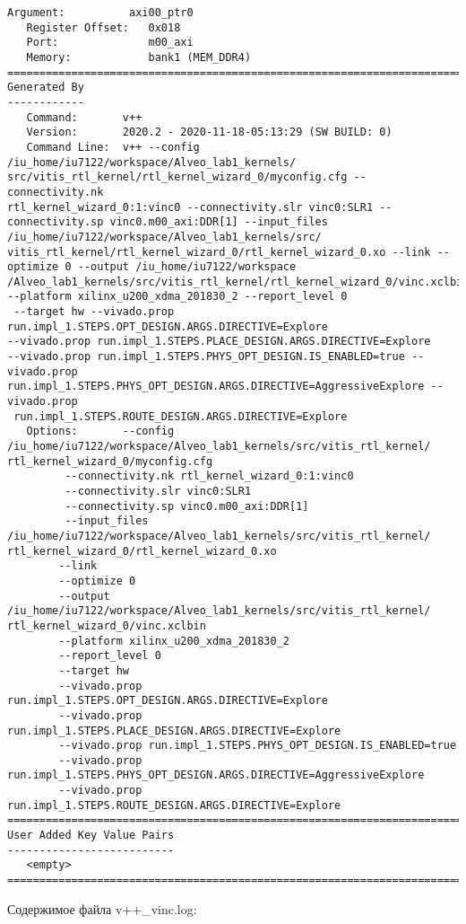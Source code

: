 \begin{lstlisting}[label=some-code-1,caption=Содержимое файла xclbin.info]
   Argument:          axi00_ptr0
   Register Offset:   0x018
   Port:              m00_axi
   Memory:            bank1 (MEM_DDR4)
==============================================================================
Generated By
------------
   Command:       v++
   Version:       2020.2 - 2020-11-18-05:13:29 (SW BUILD: 0)
   Command Line:  v++ --config /iu_home/iu7122/workspace/Alveo_lab1_kernels/
src/vitis_rtl_kernel/rtl_kernel_wizard_0/myconfig.cfg --connectivity.nk 
rtl_kernel_wizard_0:1:vinc0 --connectivity.slr vinc0:SLR1 --connectivity.sp vinc0.m00_axi:DDR[1] --input_files 
/iu_home/iu7122/workspace/Alveo_lab1_kernels/src/
vitis_rtl_kernel/rtl_kernel_wizard_0/rtl_kernel_wizard_0.xo --link --optimize 0 --output /iu_home/iu7122/workspace
/Alveo_lab1_kernels/src/vitis_rtl_kernel/rtl_kernel_wizard_0/vinc.xclbin --platform xilinx_u200_xdma_201830_2 --report_level 0
 --target hw --vivado.prop run.impl_1.STEPS.OPT_DESIGN.ARGS.DIRECTIVE=Explore 
--vivado.prop run.impl_1.STEPS.PLACE_DESIGN.ARGS.DIRECTIVE=Explore 
--vivado.prop run.impl_1.STEPS.PHYS_OPT_DESIGN.IS_ENABLED=true --vivado.prop 
run.impl_1.STEPS.PHYS_OPT_DESIGN.ARGS.DIRECTIVE=AggressiveExplore --vivado.prop
 run.impl_1.STEPS.ROUTE_DESIGN.ARGS.DIRECTIVE=Explore 
   Options:       --config /iu_home/iu7122/workspace/Alveo_lab1_kernels/src/vitis_rtl_kernel/
rtl_kernel_wizard_0/myconfig.cfg
         --connectivity.nk rtl_kernel_wizard_0:1:vinc0
         --connectivity.slr vinc0:SLR1
         --connectivity.sp vinc0.m00_axi:DDR[1]
         --input_files /iu_home/iu7122/workspace/Alveo_lab1_kernels/src/vitis_rtl_kernel/
rtl_kernel_wizard_0/rtl_kernel_wizard_0.xo
        --link
        --optimize 0
        --output /iu_home/iu7122/workspace/Alveo_lab1_kernels/src/vitis_rtl_kernel/
rtl_kernel_wizard_0/vinc.xclbin
        --platform xilinx_u200_xdma_201830_2
        --report_level 0
        --target hw
        --vivado.prop run.impl_1.STEPS.OPT_DESIGN.ARGS.DIRECTIVE=Explore
        --vivado.prop run.impl_1.STEPS.PLACE_DESIGN.ARGS.DIRECTIVE=Explore
        --vivado.prop run.impl_1.STEPS.PHYS_OPT_DESIGN.IS_ENABLED=true
        --vivado.prop run.impl_1.STEPS.PHYS_OPT_DESIGN.ARGS.DIRECTIVE=AggressiveExplore
        --vivado.prop run.impl_1.STEPS.ROUTE_DESIGN.ARGS.DIRECTIVE=Explore 
==============================================================================
User Added Key Value Pairs
--------------------------
   <empty>
==============================================================================
\end{lstlisting}

Содержимое файла v++\_vinc.log:

